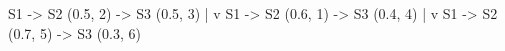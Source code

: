 S1 -> S2 (0.5, 2) -> S3 (0.5, 3)
     |
     v
S1 -> S2 (0.6, 1) -> S3 (0.4, 4)
     |
     v
S1 -> S2 (0.7, 5) -> S3 (0.3, 6)